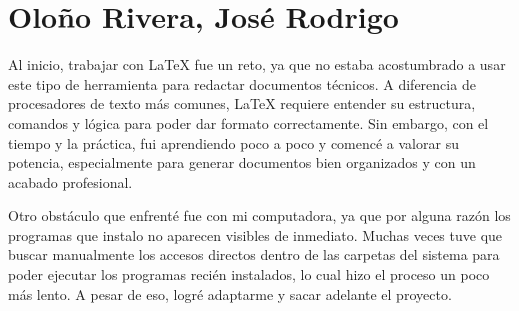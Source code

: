 \section{Oloño Rivera, José Rodrigo}

Al inicio, trabajar con LaTeX fue un reto, ya que no estaba acostumbrado a usar este tipo de herramienta para redactar documentos técnicos. A diferencia de procesadores de texto más comunes, LaTeX requiere entender su estructura, comandos y lógica para poder dar formato correctamente. Sin embargo, con el tiempo y la práctica, fui aprendiendo poco a poco y comencé a valorar su potencia, especialmente para generar documentos bien organizados y con un acabado profesional.

Otro obstáculo que enfrenté fue con mi computadora, ya que por alguna razón los programas que instalo no aparecen visibles de inmediato. Muchas veces tuve que buscar manualmente los accesos directos dentro de las carpetas del sistema para poder ejecutar los programas recién instalados, lo cual hizo el proceso un poco más lento. A pesar de eso, logré adaptarme y sacar adelante el proyecto.
